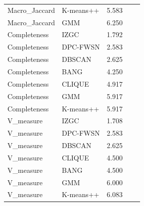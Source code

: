 \begin{table}[ht]
\begin{tabular}{lllll}
Macro_Jaccard & K-means++ & 5.583\\
Macro_Jaccard & GMM & 6.250\\
Completeness & IZGC & 1.792\\
Completeness & DPC-FWSN & 2.583\\
Completeness & DBSCAN & 2.625\\
Completeness & BANG & 4.250\\
Completeness & CLIQUE & 4.917\\
Completeness & GMM & 5.917\\
Completeness & K-means++ & 5.917\\
V_measure & IZGC & 1.708\\
V_measure & DPC-FWSN & 2.583\\
V_measure & DBSCAN & 2.625\\
V_measure & CLIQUE & 4.500\\
V_measure & BANG & 4.500\\
V_measure & GMM & 6.000\\
V_measure & K-means++ & 6.083\\

\bottomrule

\end{tabular}

\end{table}
